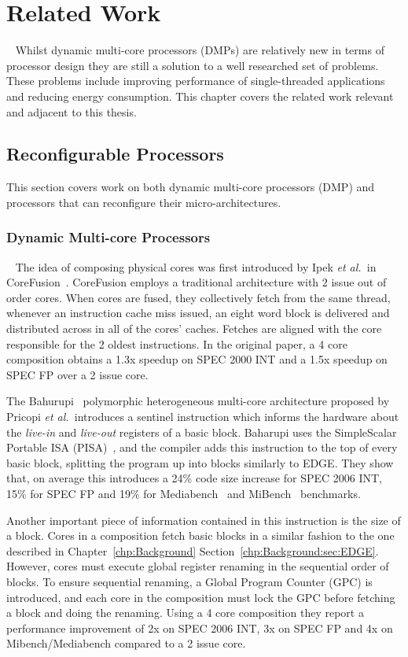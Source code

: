 \chapter{Related Work}~\label{chp:rw}
Whilst dynamic multi-core processors (DMPs) are relatively new in terms of processor design they are still a solution to a well researched set of problems.
These problems include improving performance of single-threaded applications and reducing energy consumption.
This chapter covers the related work relevant and adjacent to this thesis.
\vspace{-3em}
\section{Reconfigurable Processors}

This section covers work on both dynamic multi-core processors (DMP) and processors that can reconfigure their micro-architectures.
\vspace{-1em}
\subsection{Dynamic Multi-core Processors}~\label{chp:rw:sec:dmp}
The idea of composing physical cores was first introduced by Ipek {\it et al.~}in CoreFusion~\cite{ipek2007CoreFusion}.
CoreFusion employs a traditional architecture with 2 issue out of order cores.
When cores are fused, they collectively fetch from the same thread, whenever an instruction cache miss issued, an eight word block is delivered and distributed across in all of the cores' caches.
Fetches are aligned with the core responsible for the 2 oldest instructions.
In the original paper, a 4 core composition obtains a 1.3x speedup on SPEC 2000 INT and a 1.5x speedup on SPEC FP over a 2 issue core.
 
The Bahurupi~\cite{pricopi2012bahurupi} polymorphic heterogeneous multi-core architecture proposed by Pricopi {\it et al.~}introduces a sentinel instruction which informs the hardware about the \textit{live-in} and \textit{live-out} registers of a basic block.
Baharupi uses the SimpleScalar Portable ISA (PISA)~\cite{burger1997simplescalar}, and the compiler adds this instruction to the top of every basic block, splitting the program up into blocks similarly to EDGE.
They show that, on average this introduces a 24\% code size increase for SPEC 2006 INT, 15\% for SPEC FP and 19\% for Mediabench~\cite{mediabench} and MiBench~\cite{mibench} benchmarks.

Another important piece of information contained in this instruction is the size of a block.
Cores in a composition fetch basic blocks in a similar fashion to the one described in Chapter~\ref{chp:Background} Section~\ref{chp:Background:sec:EDGE}.
However, cores must execute global register renaming in the sequential order of blocks.
To ensure sequential renaming, a Global Program Counter (GPC) is introduced, and each core in the composition must lock the GPC before fetching a block and doing the renaming.
Using a 4 core composition they report a performance improvement of 2x on SPEC 2006 INT, 3x on SPEC FP and 4x on Mibench/Mediabench compared to a 2 issue core. 

